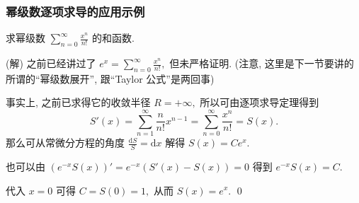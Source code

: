 
\begin{frame}
\frametitle{幂级数逐项求导的应用示例}

\begin{eg}
求幂级数 $\displaystyle \sum_{n=0}^{\infty} \frac{x^n}{n!}$ 的和函数.
\end{eg}

\pause
\vspace{0.5em}

\startproof[bg=yellow, fg=red](解)
之前已经讲过了 $e^x = \sum_{n=0}^{\infty} \frac{x^n}{n!},$ 但未严格证明. (注意, 这里是下一节要讲的所谓的``幂级数展开'', 跟``Taylor 公式''是两回事)

\pause
\vspace{0.5em}

事实上, 之前已求得它的收敛半径 $R = +\infty,$ 所以可由逐项求导定理得到
\[
S'(x) = \sum_{n=1}^{\infty} \frac{n}{n!} x^{n-1} = \sum_{n=0}^{\infty} \frac{x^n}{n!} = S(x).
\]
那么可从常微分方程的角度 $\frac{\mathrm{d}S}{S} = \mathrm{d}x$ 解得 $S(x) = C e^x.$

\pause

也可以由 $\left( e^{-x} S(x) \right)' = e^{-x} \left( S'(x) - S(x) \right) = 0$ 得到 $e^{-x} S(x) = C.$

\pause

代入 $x = 0$ 可得 $C = S(0) = 1,$ 从而 $S(x) = e^x.$
\qed

\end{frame}


